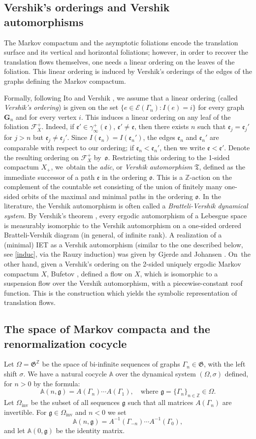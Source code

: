 \documentclass[10pt]{amsart}
\let\mathcal\mathscr
\newcommand{\inv}{\mathrm{inv}}
\theoremstyle{plain}
\theoremstyle{definition}
\newcommand \G {{\boldsymbol G}}
\let\gam\gamma
\let\Om\Omega
\let\Gam\Gamma
\let\sig\sigma
\newcommand\ef{\mathfrak{e}}
\newcommand\gf{\mathfrak{g}}
\newcommand\ok{\mathfrak{o}}
\newcommand\Frg{\mathfrak{G}}
\newcommand{\Ek}{\mathcal{E}}
\newcommand{\Fk}{\mathcal{F}}
\newcommand\Aa{\mathbb{A}}
\newcommand{\Z}{\mathbb{Z}}
\let\Subsection\subsection\let\Subsubsection\subsubsection
\begin{document}
\subsection{Vershik's orderings and Vershik automorphisms}
The Markov compactum and the asymptotic foliations encode the translation surface and its vertical and horizontal foliations; however, in order to recover the translation flows themselves, one needs a linear ordering on the leaves of the foliation. This linear ordering is induced by Vershik's orderings of the edges of the graphs defining the Markov compactum.

Formally, following Ito \cite{Ito} and Vershik \cite{Vershik1,Vershik2}, we assume that a linear ordering (called \emph{Vershik's ordering}) is given on the set $\{e\in \Ek(\Gam_n): I(e)=i\}$ for every graph~$\G_n$ and for every vertex $i$. This induces a linear ordering on any leaf of the foliation $\Fk_X^+$. Indeed, if $\ef' \in \gam_\infty^+(\ef)$, $\ef'\ne \ef$, then there exists $n$ such that $\ef_j = \ef_j'$ for $j>n$ but $\ef_j \ne \ef_j'$. Since $I(\ef_n) = I(\ef_n')$, the edges $\ef_n$ and $\ef_n'$ are comparable with respect to our ordering; if $\ef_n < \ef_n'$, then we write $\ef< \ef'$.
Denote the resulting ordering on $\Fk_X^+$ by~$\ok$.
Restricting this ordering to the 1-sided compactum $X_+$, we~obtain the \emph{adic}, or \emph{Vershik automorphism}
$\mathfrak{T}$, defined as the immediate successor of a path $\ef$ in the ordering $\ok$. This is a $\Z$-action on the complement of the countable set consisting of the union of finitely many one-sided orbits of the maximal and minimal paths in the ordering $\ok$. In the literature, the Vershik automorphism is often called a \emph{Bratteli-Vershik dynamical system}.
By Vershik's theorem \cite{Vershik1,Vershik2}, every ergodic automorphism of a Lebesgue space is measurably isomorphic to the Vershik automorphism on a one-sided ordered Bratteli-Vershik diagram (in general, of infinite rank). A realization of a (minimal) IET as a Vershik automorphism (similar to the one described below, see \eqref{induc}, via the Rauzy induction) was given by Gjerde and Johansen \cite{GJ}. On~the other hand, given a Vershik's ordering on the 2-sided uniquely ergodic Markov compactum $X$, Bufetov \cite{Buf-umn}, defined a flow on $X$, which is isomorphic to a suspension flow over the Vershik automorphism, with a piecewise-constant roof function. This is the construction which yields the symbolic representation of translation flows.

\Subsection{The space of Markov compacta and the renormalization cocycle} Let $\Om=\Frg^\Z$ be the space of bi-infinite sequences of graphs $\Gam_n \in \Frg$, with the left shift
$\sig$. We have a natural cocycle $\Aa$ over the dynamical system $(\Om,\sig)$ defined, for $n>0$ by the formula:
\[
\Aa(n,\gf) = A(\Gam_n)\cdots A(\Gam_1),\quad \text{where } \gf = \{\Gam_n\}_{n\in \Z}\in \Om.
\]
Let $\Om_{\inv}$ be the subset of all sequences $\gf$ such that all matrices $A(\Gam_n)$ are invertible. For $\gf\in \Om_{\inv}$ and $n<0$ we set
\[
\Aa(n,\gf) = A^{-1}(\Gam_{-n})\cdots A^{-1}(\Gam_0),
\]
and let $\Aa(0,\gf)$ be the identity matrix.
\end{document}
